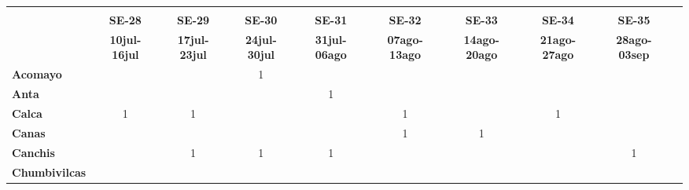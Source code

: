\begin{tabular}{lccccccccc}
	\textbf{}              	  & \multicolumn{1}{l}{}                        & \multicolumn{1}{l}{}      & \multicolumn{1}{l}{}                         & \multicolumn{1}{l}{}                         & \multicolumn{1}{l}{}                         & \multicolumn{1}{l}{}                        & \multicolumn{1}{l}{}                         & \multicolumn{1}{l}{}     \\                   
	\textbf{}                                                                          		
	&\textbf{SE-28}								&\textbf{SE-29} 							&\textbf{SE-30}								&\textbf{SE-31} 							&\textbf{SE-32}								&\textbf{SE-33}								&\textbf{SE-34}								&\textbf{SE-35}\\							
	\textbf{}              	  		
	&\textbf{10jul-16jul}						&\textbf{17jul-23jul}						&\textbf{24jul-30jul}						&\textbf{31jul-06ago}						&\textbf{07ago-13ago}						&\textbf{14ago-20ago}						&\textbf{21ago-27ago}						&\textbf{28ago-03sep}\\
	\textbf{Acomayo}                        		
	&\cellcolor[HTML]{FCC46C}					&\cellcolor[HTML]{FCC46C}
	&1											&\cellcolor[HTML]{FCC46C}
	&\cellcolor[HTML]{FCC46C}					&\cellcolor[HTML]{FCC46C}
	&\cellcolor[HTML]{FCC46C}					&\cellcolor[HTML]{FCC46C}\\
	\textbf{Anta}                                                   		
	&\cellcolor[HTML]{FCC46C}					&\cellcolor[HTML]{FCC46C}					&\cellcolor[HTML]{FCC46C}					&1											&\cellcolor[HTML]{FCC46C}					&\cellcolor[HTML]{FCC46C}					&\cellcolor[HTML]{FCC46C}					&\cellcolor[HTML]{FCC46C}\\					
	\textbf{Calca}      				       								            
	&1				   							&1  										&\cellcolor[HTML]{FCC46C}	 	 	    	&\cellcolor[HTML]{FCC46C}					&1											&\cellcolor[HTML]{FCC46C}					&1											&\cellcolor[HTML]{FCC46C}\\          			
	\textbf{Canas}                              											
	&\cellcolor[HTML]{FCC46C} 					&\cellcolor[HTML]{FCC46C}
	&\cellcolor[HTML]{FCC46C}					&\cellcolor[HTML]{FCC46C}
	&1											&1
	&\cellcolor[HTML]{FCC46C}					&\cellcolor[HTML]{FCC46C}\\	
	\textbf{Canchis}                             											
	&\cellcolor[HTML]{FCC46C}					&1											&1											&1			
	&\cellcolor[HTML]{FCC46C}					&\cellcolor[HTML]{FCC46C}			&\cellcolor[HTML]{FCC46C}					&1\\											
	\textbf{Chumbivilcas}                      												

\end{tabular}
